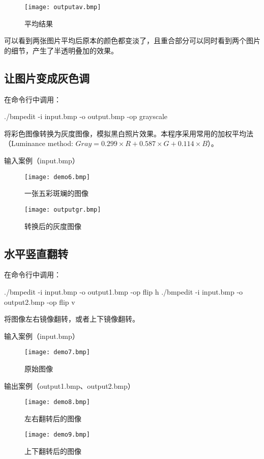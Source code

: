 \documentclass[11pt]{article}
\begin{document}
\begin{figure}[H]
  \centering
  \texttt{[image: outputav.bmp]}
  \caption{平均结果}
  \label{fig:example}
\end{figure}
可以看到两张图片平均后原本的颜色都变淡了，且重合部分可以同时看到两个图片的细节，产生了半透明叠加的效果。


\subsection{让图片变成灰色调}
在命令行中调用：
\begin{commandline}
./bmpedit -i input.bmp -o output.bmp -op grayscale 
\end{commandline}
将彩色图像转换为灰度图像，模拟黑白照片效果。本程序采用常用的加权平均法（Luminance method: $Gray = 0.299 \times R + 0.587 \times G + 0.114 \times B$）。


输入案例（input.bmp）
\begin{figure}[H]
  \centering
  \begin{minipage}[b]{0.45\textwidth}
    \centering
    \texttt{[image: demo6.bmp]}
   \caption{一张五彩斑斓的图像}
    \label{fig:image1}
  \end{minipage}
  \hfill %
  \begin{minipage}[b]{0.45\textwidth}
    \centering
    \texttt{[image: outputgr.bmp]}
  \caption{转换后的灰度图像}
    \label{fig:image2}
  \end{minipage}
\end{figure}


\subsection{水平竖直翻转}
在命令行中调用：
\begin{commandline}
./bmpedit -i input.bmp -o output1.bmp -op flip h
./bmpedit -i input.bmp -o output2.bmp -op flip v
\end{commandline}
将图像左右镜像翻转，或者上下镜像翻转。


输入案例（input.bmp）
\begin{figure}[H]
  \centering
  \texttt{[image: demo7.bmp]}
  \caption{原始图像}
  \label{fig:example}
\end{figure}

输出案例（output1.bmp、output2.bmp）
\begin{figure}[H]
  \centering
  \begin{minipage}[b]{0.45\textwidth}
    \centering
    \texttt{[image: demo8.bmp]}
   \caption{左右翻转后的图像}
    \label{fig:image1}
  \end{minipage}
  \hfill %
  \begin{minipage}[b]{0.45\textwidth}
    \centering
    \texttt{[image: demo9.bmp]}
  \caption{上下翻转后的图像}
    \label{fig:image2}
  \end{minipage}
\end{figure}
\end{document}
